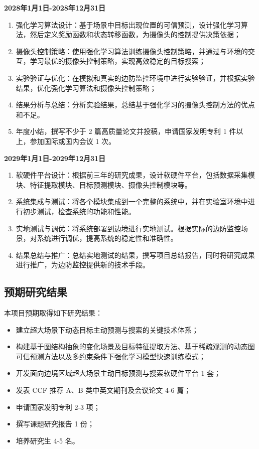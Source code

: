 \textbf{2028年1月1日-2028年12月31日}

\begin{enumerate}[left=30pt,label=(\arabic*),itemsep=1em]
\item 强化学习算法设计：基于场景中目标出现位置的可信预测，设计强化学习算法，然后定义奖励函数和状态转移函数，为摄像头的控制提供决策依据；
\item 摄像头控制策略：使用强化学习算法训练摄像头控制策略，并通过与环境的交互，学习最优的摄像头控制策略，实现高效稳定的目标搜索；
\item 实验验证与优化：在模拟和真实的边防监控环境中进行实验验证，并根据实验结果，优化强化学习算法和摄像头控制策略；
\item 结果分析与总结：分析实验结果，总结基于强化学习的摄像头控制方法的优点和不足。
\item 年度小结，撰写不少于 2 篇高质量论文并投稿，申请国家发明专利 1 件以上，参加国际或国内会议 1 次。
\end{enumerate}

\textbf{2029年1月1日-2029年12月31日}

\begin{enumerate}[left=30pt,label=(\arabic*),itemsep=1em]
\item 软硬件平台设计：根据前三年的研究成果，设计软硬件平台，包括数据采集模块、特征提取模块、目标预测模块、摄像头控制模块等。
\item 系统集成与测试：将各个模块集成到一个完整的系统中，并在实验室环境中进行初步测试，检查系统的功能和性能。
\item 实地测试与调优：将系统部署到边境进行实地测试。根据实际的边防监控场景，对系统进行调优，提高系统的稳定性和准确性。
\item 结果总结与推广：总结实地测试的结果，撰写项目总结报告，同时将研究成果进行推广，为边防监控提供新的技术手段。
\end{enumerate}










\subsection{预期研究结果}
本项目预期取得如下研究结果：

\begin{itemize}[left=15pt,,itemsep=1em,label={\textasteriskcentered}]
\item 建立超大场景下动态目标主动预测与搜索的关键技术体系；
\item 构建基于图结构抽象的变化场景及目标特征提取方法、基于稀疏观测的动态图可信预测方法以及多约束条件下强化学习模型快速训练模式；
\item 开发面向边境区域超大场景主动目标预测与搜索软硬件平台 1 套；
\item 发表 CCF 推荐 A、B 类中英文期刊及会议论文 4-6 篇；
\item 申请国家发明专利 2-3 项；
\item 撰写课题研究报告 1 份；
\item 培养研究生 4-5 名。
\end{itemize}
